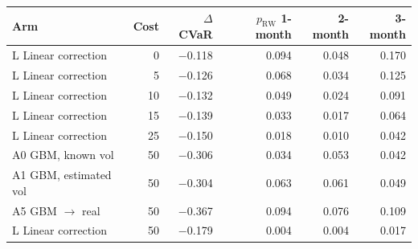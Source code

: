 \begin{tabular}{lrrrrr}
\toprule
Arm & Cost & $\Delta$CVaR & $p_{\text{RW}}$ 1-month & 2-month & 3-month \\
\midrule
L Linear correction & 0 & $-$0.118 & 0.094 & 0.048 & 0.170 \\
L Linear correction & 5 & $-$0.126 & 0.068 & 0.034 & 0.125 \\
L Linear correction & 10 & $-$0.132 & 0.049 & 0.024 & 0.091 \\
L Linear correction & 15 & $-$0.139 & 0.033 & 0.017 & 0.064 \\
L Linear correction & 25 & $-$0.150 & 0.018 & 0.010 & 0.042 \\
A0 GBM, known vol & 50 & $-$0.306 & 0.034 & 0.053 & 0.042 \\
A1 GBM, estimated vol & 50 & $-$0.304 & 0.063 & 0.061 & 0.049 \\
A5 GBM $\to$ real & 50 & $-$0.367 & 0.094 & 0.076 & 0.109 \\
L Linear correction & 50 & $-$0.179 & 0.004 & 0.004 & 0.017 \\
\bottomrule
\end{tabular}
